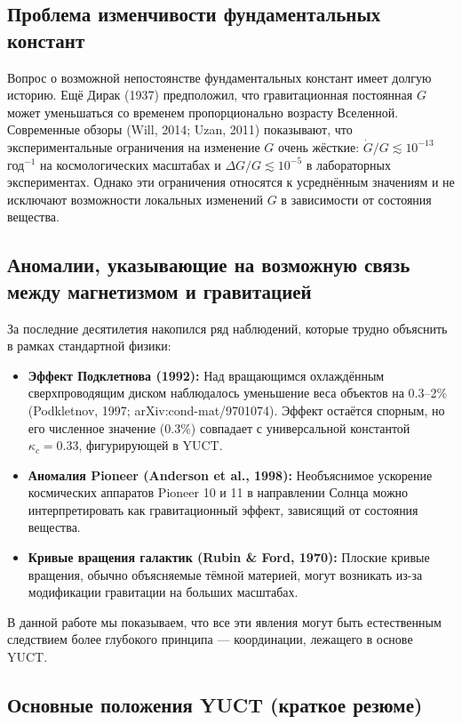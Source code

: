 \documentclass[12pt]{article}
\theoremstyle{remark}
\newcommand{\kappac}{\kappa_c}
\begin{document}
	\subsection{Проблема изменчивости фундаментальных констант}
	\label{subsec:constants-variation}
	
	Вопрос о возможной непостоянстве фундаментальных констант имеет долгую историю. Ещё Дирак (1937) предположил, что гравитационная постоянная $G$ может уменьшаться со временем пропорционально возрасту Вселенной. Современные обзоры (Will, 2014; Uzan, 2011) показывают, что экспериментальные ограничения на изменение $G$ очень жёсткие: $\dot{G}/G \lesssim 10^{-13}$ год$^{-1}$ на космологических масштабах и $\Delta G/G \lesssim 10^{-5}$ в лабораторных экспериментах. Однако эти ограничения относятся к усреднённым значениям и не исключают возможности локальных изменений $G$ в зависимости от состояния вещества.
	
	\subsection{Аномалии, указывающие на возможную связь между магнетизмом и гравитацией}
	\label{subsec:anomalies}
	
	За последние десятилетия накопился ряд наблюдений, которые трудно объяснить в рамках стандартной физики:
	\begin{itemize}
		\item \textbf{Эффект Подклетнова (1992):} Над вращающимся охлаждённым сверхпроводящим диском наблюдалось уменьшение веса объектов на 0.3–2\% (Podkletnov, 1997; arXiv:cond-mat/9701074). Эффект остаётся спорным, но его численное значение (0.3\%) совпадает с универсальной константой $\kappac = 0.33$, фигурирующей в YUCT.
		\item \textbf{Аномалия Pioneer (Anderson et al., 1998):} Необъяснимое ускорение космических аппаратов Pioneer 10 и 11 в направлении Солнца можно интерпретировать как гравитационный эффект, зависящий от состояния вещества.
		\item \textbf{Кривые вращения галактик (Rubin \& Ford, 1970):} Плоские кривые вращения, обычно объясняемые тёмной материей, могут возникать из-за модификации гравитации на больших масштабах.
	\end{itemize}
	В данной работе мы показываем, что все эти явления могут быть естественным следствием более глубокого принципа — координации, лежащего в основе YUCT.
	
	\subsection{Основные положения YUCT (краткое резюме)}
	\label{subsec:yuct-core}
	
\end{document}
